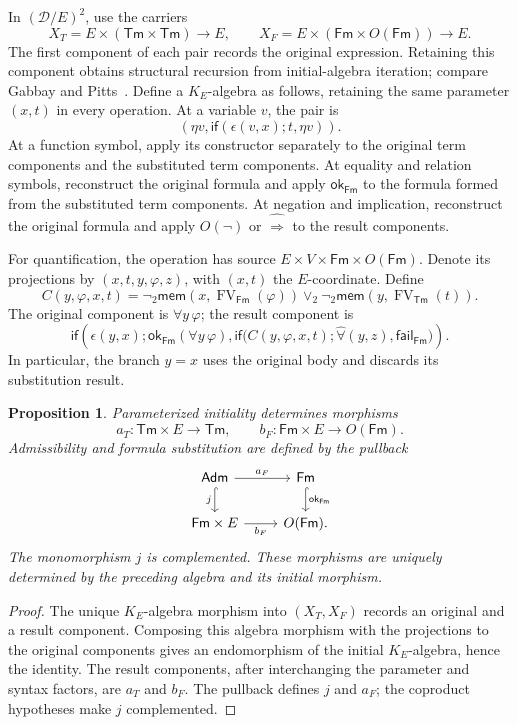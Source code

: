 \documentclass[11pt]{article}
\newtheorem{proposition}[theorem]{Proposition}
\theoremstyle{definition}\newtheorem{definition}[theorem]{Definition}
\newcommand{\Tm}{\mathsf{Tm}}
\newcommand{\Fm}{\mathsf{Fm}}
\newcommand{\FV}{\operatorname{FV}}
\newcommand{\Adm}{\mathsf{Adm}}
\newcommand{\mem}{\mathsf{mem}}
\newcommand{\ok}{\mathsf{ok}}
\newcommand{\fail}{\mathsf{fail}}
\begin{document}
In $(\mathcal D/E)^2$, use the carriers
\[
 X_T=E\times(\Tm\times\Tm)\longrightarrow E,
 \qquad
 X_F=E\times(\Fm\times O(\Fm))\longrightarrow E.
\]
The first component of each pair records the original expression.
Retaining this component obtains structural recursion from initial-algebra
iteration; compare Gabbay and Pitts~\cite[proof of Corollary 6.7]{GabbayPitts}.
Define a $K_E$-algebra as follows, retaining the same parameter
$(x,t)$ in every operation. At a variable $v$, the pair is
\[
 (\eta v,\mathsf{if}(\epsilon(v,x);t,\eta v)).
\]
At a function symbol, apply its constructor separately to the
original term components and the substituted term components.
At equality and relation symbols, reconstruct the original formula
and apply $\ok_{\Fm}$ to the formula formed from the substituted
term components. At negation and implication, reconstruct the
original formula and apply $O(\neg)$ or
$\widehat{\Rightarrow}$ to the result components.

For quantification, the operation has source
$E\times V\times\Fm\times O(\Fm)$.
Denote its projections by $(x,t,y,\varphi,z)$, with $(x,t)$ the
$E$-coordinate. Define
\[
 C(y,\varphi,x,t)=
 \neg_2\mem(x,\FV_{\Fm}(\varphi))
 \vee_2\neg_2\mem(y,\FV_{\Tm}(t)).
\]
The original component is $\forall y\,\varphi$; the result component is
\begin{equation}\label{eq:quantifier-fold}
 \mathsf{if}\left(\epsilon(y,x);
   \ok_{\Fm}(\forall y\,\varphi),
   \mathsf{if}\bigl(C(y,\varphi,x,t);
          \widehat\forall(y,z),\fail_{\Fm}\bigr)\right).
\end{equation}
In particular, the branch $y=x$ uses the original body and discards
its substitution result.

\begin{proposition}\label{prop:categorical-substitution}
Parameterized initiality determines morphisms
\[
 a_T:\Tm\times E\longrightarrow\Tm,
 \qquad b_F:\Fm\times E\longrightarrow O(\Fm).
\]
Admissibility and formula substitution are defined by the pullback
\[
\begin{tikzcd}
 \Adm\arrow[r,"a_F"]\arrow[d,hook,"j"'] &
 \Fm\arrow[d,hook,"\ok_{\Fm}"]\\
 \Fm\times E\arrow[r,"b_F"'] & O(\Fm).
\end{tikzcd}
\]
The monomorphism $j$ is complemented. These morphisms are uniquely
determined by the preceding algebra and its initial morphism.
\end{proposition}
\begin{proof}
The unique $K_E$-algebra morphism into $(X_T,X_F)$ records an original
and a result component. Composing this algebra morphism with the
projections to the original components gives an endomorphism of the
initial $K_E$-algebra, hence the identity. The result components,
after interchanging the parameter
and syntax factors, are $a_T$ and $b_F$. The pullback defines
$j$ and $a_F$; the coproduct hypotheses make $j$ complemented.
\end{proof}
\end{document}
